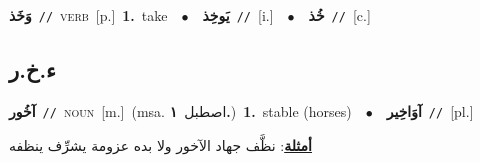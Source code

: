 \documentclass[10pt,a4paper,twoside]{article} %
\begin{document}
\begin{multicols}{2}
{{{{{{{\setlength\topsep{0pt}\textbf{\foreignlanguage{arabic}{وَخَذ}}\ {\color{gray}\texttt{//}\color{black}}\ \textsc{verb}\ [p.]\ \textbf{1.}~take\ \ $\bullet$\ \ \setlength\topsep{0pt}\textbf{\foreignlanguage{arabic}{يَوخِذ}}\ {\color{gray}\texttt{//}\color{black}}\ [i.]\ \ $\bullet$\ \ \setlength\topsep{0pt}\textbf{\foreignlanguage{arabic}{خُذ}}\ {\color{gray}\texttt{//}\color{black}}\ [c.]\ 

\vspace{-3mm}
\subsection*{\color{blue}\foreignlanguage{arabic}{ء.خ.ر}\color{blue}{}} 

{\setlength\topsep{0pt}\textbf{\foreignlanguage{arabic}{آخُور}}\ {\color{gray}\texttt{//}\color{black}}\ \textsc{noun}\ [m.]\ \color{gray}(msa. \foreignlanguage{arabic}{اصطبل}~\foreignlanguage{arabic}{\textbf{١.}})\color{black}\ \textbf{1.}~stable (horses)\ \ $\bullet$\ \ \setlength\topsep{0pt}\textbf{\foreignlanguage{arabic}{آوَاخِير}}\ {\color{gray}\texttt{//}\color{black}}\ [pl.]\  \begin{flushright}\color{gray}\foreignlanguage{arabic}{\textbf{\underline{\foreignlanguage{arabic}{أمثلة}}}: نظَّف جهاد الآخور ولا بده عزومة يشرِّف ينظفه}\end{flushright}\color{black}} \vspace{2mm}

}}}}}}}
\end{multicols}
\end{document}
